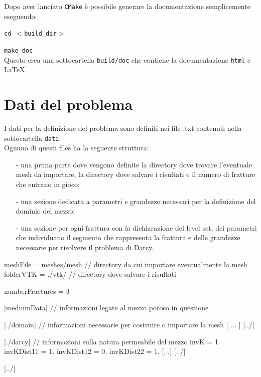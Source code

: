 \noindent Dopo aver lanciato \texttt{CMake} è possibile generare la documentazione semplicemente eseguendo: \\
\par \texttt{cd $<$build\_dir$>$} 
\par \texttt{make doc} \\

\noindent Questo crea una sottocartella \texttt{build/doc} che contiene la documentazione \texttt{html} e \LaTeX{}.

\newpage
\section{Dati del problema}
I dati per la definizione del problema sono definiti nei file .txt contenuti nella sottocartella \texttt{dati}. \\
\noindent Ognuno di questi files ha la seguente struttura:

\begin{enumerate}
\item[-] una prima parte dove vengono definite la directory dove trovare l'eventuale mesh da importare, la directory dove salvare i risultati e il numero di fratture che entrano in gioco;
\item[-] una sezione dedicata a parametri e grandezze necessari per la definizione del dominio del mezzo;
\item[-] una sezione per ogni frattura con la dichiarazione del level set, dei parametri che individuano il segmento che rappresenta la frattura e delle grandezze necessarie per risolvere il problema di Darcy.
\end{enumerate}

\begin{Code03_01}[caption={Definizione del dominio}]
meshFile = meshes/mesh		//   directory da cui importare eventualmente la mesh
folderVTK = ./vtk/				//   directory dove salvare i risultati

numberFractures = 3

[mediumData]					//   informazioni legate al mezzo poroso in questione

   [./domain]					//   informazioni necessarie per costruire o importare la mesh 
     [ ... ]
   [../]

   [./darcy]					//   informazioni sulla natura permeabile del mezzo
     invK = 1.
     invKDist11 = 1.
     invKDist12 = 0.
     invKDist22 = 1.
     [...]	
   [../]

[../]

\end{Code03_01}

